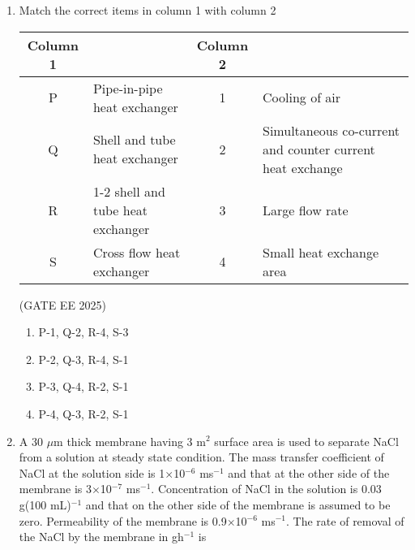 \documentclass[journal,12pt,onecolumn]{IEEEtran}
\theoremstyle{remark}
\begin{document}
\begin{enumerate}
\hfill(GATE EE 2025)

\begin{multicols}{2}
\begin{enumerate}
\item P-3, Q-2, R-4, S-1
\item P-3, Q-1, R-2, S-4
\item P-3, Q-1, R-4, S-2
\item P-4, Q-3, R-1, S-2
\end{enumerate}
\end{multicols}

\item Match the correct items in column 1 with column 2

\begin{center}
\begin{tabular}{|c|l|c|l|}
\hline
\textbf{Column 1} & & \textbf{Column 2} & \\
\hline
P & Pipe-in-pipe heat exchanger & 1 & Cooling of air \\
Q & Shell and tube heat exchanger & 2 & Simultaneous co-current and counter current heat exchange \\
R & 1-2 shell and tube heat exchanger & 3 & Large flow rate \\
S & Cross flow heat exchanger & 4 & Small heat exchange area \\
\hline
\end{tabular}
\end{center}

\hfill(GATE EE 2025)

\begin{multicols}{2}
\begin{enumerate}
\item P-1, Q-2, R-4, S-3
\item P-2, Q-3, R-4, S-1
\item P-3, Q-4, R-2, S-1
\item P-4, Q-3, R-2, S-1
\end{enumerate}
\end{multicols}

\item A 30 $\mu$m thick membrane having 3 m$^2$ surface area is used to separate NaCl from a solution at steady state condition. The mass transfer coefficient of NaCl at the solution side is 1$\times$10$^{-6}$ ms$^{-1}$ and that at the other side of the membrane is 3$\times$10$^{-7}$ ms$^{-1}$. Concentration of NaCl in the solution is 0.03 g(100 mL)$^{-1}$ and that on the other side of the membrane is assumed to be zero. Permeability of the membrane is 0.9$\times$10$^{-6}$ ms$^{-1}$. The rate of removal of the NaCl by the membrane in gh$^{-1}$ is


\end{enumerate}
\end{document}
